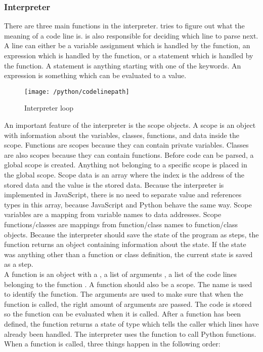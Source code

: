 \subsubsection{Interpreter}
There are three main functions in the interpreter.  tries to figure out what the meaning of a code line is.  is also responsible for deciding which line to parse next. A line can either be a variable assignment which is handled by the  function, an expression which is handled by the  function, or a statement which is handled by the  function. A statement is anything starting with one of the keywords. An expression is something which can be evaluated to a value.
\begin{figure}[H]
    \centering
    \texttt{[image: /python/codelinepath]}
    \caption{Interpreter loop}
    \label{fig:pythonCodeLinePath}
\end{figure}
An important feature of the interpreter is the scope objects. A scope is an object with information about the variables, classes, functions, and data inside the scope. Functions are scopes because they can contain private variables. Classes are also scopes because they can contain functions. Before code can be parsed, a global scope is created. Anything not belonging to a specific scope is placed in the global scope. Scope data is an array where the index is the address of the stored data and the value is the stored data. Because the interpreter is implemented in JavaScript, there is no need to separate value and references types in this array, because JavaScript and Python behave the same way. Scope variables are a mapping from variable names to data addresses. Scope functions/classes are mappings from function/class names to function/class objects. Because the interpreter should save the state of the program as steps, the  function returns an object containing information about the state. If the state was anything other than a function or class definition, the current state is saved as a step.
\\[11pt]
A function is an object with a , a list of arguments , a list of the code lines belonging to the function . A function should also be a scope. The name is used to identify the function. The arguments are used to make sure that when the function is called, the right amount of arguments are passed. The code is stored so the function can be evaluated when it is called. After a function has been defined, the  function returns a state of type  which tells the caller which lines have already been handled. The interpreter uses the  function to call Python functions. When a function is called, three things happen in the following order:
